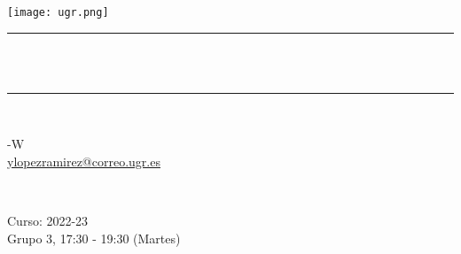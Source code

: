 \begin{titlepage}
	\centering
	\texttt{[image: ugr.png]}\\[1.0 cm]
	\rule{\linewidth}{0.2 mm} \\[0.4 cm]
	{ \huge \bfseries \thetitle}\\
	\rule{\linewidth}{0.2 mm} \\[1.5 cm]
	
	\begin{minipage}{0.5\textwidth}
		\begin{flushleft} \large
			-W \\
			\href{mailto:ylopezramirez@correo.ugr.es}{ylopezramirez@correo.ugr.es}
		\end{flushleft}
	\end{minipage}~
	\begin{minipage}{0.5\textwidth}
		\begin{flushright} \large
			Curso: 2022-23 \\
			Grupo 3, 17:30 - 19:30 (Martes)                   
		\end{flushright}
	\end{minipage}\\[1 cm]
	
	{\small \thedate}\\[1 cm]
	
	\vfill
	
\end{titlepage}